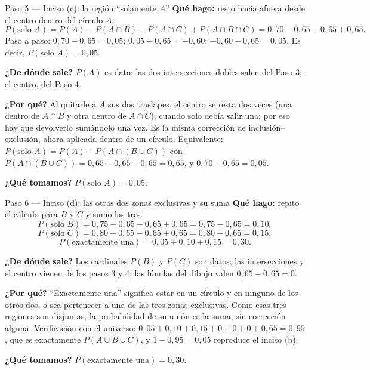 \documentclass[11pt]{article}
\begin{document}
\begin{paso}{Paso 5 --- Inciso (c): la región ``solamente $A$''}
\textbf{Qué hago:} resto hacia afuera desde el centro dentro del círculo $A$:
\[
P(\text{solo }A) = P(A) - P(A\cap B) - P(A\cap C) + P(A\cap B\cap C)
= 0{,}70-0{,}65-0{,}65+0{,}65 .
\]
Paso a paso: $0{,}70-0{,}65=0{,}05$; $0{,}05-0{,}65=-0{,}60$; $-0{,}60+0{,}65=0{,}05$. Es decir,
$P(\text{solo }A)=0{,}05$.

\textbf{¿De dónde sale?} $P(A)$ es dato; las dos intersecciones dobles salen del Paso 3; el centro, del
Paso 4.

\textbf{¿Por qué?} Al quitarle a $A$ sus dos traslapes, el centro se resta dos veces (una dentro de
$A\cap B$ y otra dentro de $A\cap C$), cuando solo debía salir una; por eso hay que devolverlo sumándolo
una vez. Es la misma corrección de inclusión--exclusión, ahora aplicada dentro de un círculo. Equivalente:
$P(\text{solo }A)=P(A)-P(A\cap(B\cup C))$ con $P(A\cap(B\cup C))=0{,}65+0{,}65-0{,}65=0{,}65$, y
$0{,}70-0{,}65=0{,}05$.

\textbf{¿Qué tomamos?} $P(\text{solo }A)=0{,}05$.
\end{paso}

\begin{paso}{Paso 6 --- Inciso (d): las otras dos zonas exclusivas y su suma}
\textbf{Qué hago:} repito el cálculo para $B$ y $C$ y sumo las tres.
\[
P(\text{solo }B) = 0{,}75-0{,}65-0{,}65+0{,}65 = 0{,}75-0{,}65 = 0{,}10,
\]
\[
P(\text{solo }C) = 0{,}80-0{,}65-0{,}65+0{,}65 = 0{,}80-0{,}65 = 0{,}15,
\]
\[
P(\text{exactamente una}) = 0{,}05+0{,}10+0{,}15 = 0{,}30 .
\]

\begin{center}
\end{center}

\textbf{¿De dónde sale?} Los cardinales $P(B)$ y $P(C)$ son datos; las intersecciones y el centro vienen
de los pasos 3 y 4; las lúnulas del dibujo valen $0{,}65-0{,}65=0$.

\textbf{¿Por qué?} ``Exactamente una'' significa estar en un círculo y en ninguno de los otros dos, o sea
pertenecer a una de las tres zonas exclusivas. Como esas tres regiones son disjuntas, la probabilidad de
su unión es la suma, sin corrección alguna. Verificación con el universo:
$0{,}05+0{,}10+0{,}15+0+0+0+0{,}65 = 0{,}95$, que es exactamente $P(A\cup B\cup C)$, y $1-0{,}95=0{,}05$
reproduce el inciso (b).

\textbf{¿Qué tomamos?} $P(\text{exactamente una})=0{,}30$.
\end{paso}
\end{document}
